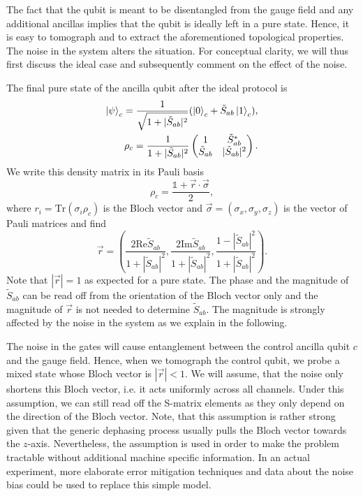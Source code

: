 \documentclass[a4paper,twocolumn,11pt, accepted=2024-06-14]{quantumarticle}
\begin{document}
The fact that the qubit is meant to be disentangled from the gauge field and any additional ancillas implies that the qubit is ideally left in a pure state. Hence, it is easy to tomograph and to extract the aforementioned topological properties. The noise in the system alters the situation. For conceptual clarity, we will thus first discuss the ideal case and subsequently comment on the effect of the noise.

The final pure state of the ancilla qubit after the ideal protocol is
\begin{equation}
\begin{split}
    \ket{\psi}_c = \frac{1}{\sqrt{1+|\tilde{S}_{ab}|^2}}(\ket{0}_c + \tilde{S}_{ab}\ket{1}_c),\\
    \rho_c = \frac{1}{1+|\tilde{S}_{ab}|^2}\begin{pmatrix}
    1 & \tilde{S}_{ab}^* \\
    \tilde{S}_{ab} & |\tilde{S}_{ab}|^2
    \end{pmatrix}.
\end{split}
\end{equation}
We write this density matrix in its Pauli basis 
\begin{equation}
    \rho_c = \frac{\mathbb{1} + \vec{r} \cdot \vec{\sigma}}{2},
\end{equation}
where  $r_i = \text{Tr}(\sigma_i\rho_c)$ is the Bloch vector and $\vec{\sigma} = (\sigma_x, \sigma_y, \sigma_z)$ is the vector of Pauli matrices and find
\begin{equation}
    \vec{r} = \left( \frac{2 \text{Re}\tilde{S}_{ab}}{1+|\tilde{S}_{ab}|^2}, \frac{2 \text{Im}\tilde{S}_{ab}}{1+|\tilde{S}_{ab}|^2}, \frac{1 - |\tilde{S}_{ab}|^2}{1+|\tilde{S}_{ab}|^2} \right).\label{eqn:bloch}
\end{equation}
Note that $|\vec{r}| = 1$ as expected for a pure state. The phase and the magnitude of $\tilde S_{ab}$ can be read off from the orientation of the Bloch vector only and the magnitude of $\vec r$ is not needed to determine $\tilde S_{ab}$. The magnitude is strongly affected by the noise in the system as we explain in the following.

The noise in the gates will cause entanglement between the control ancilla qubit $c$ and the gauge field. Hence, when we tomograph the control qubit, we probe a mixed state whose Bloch vector is $|\vec{r}|< 1$. We will assume, that the noise only shortens this Bloch vector, i.e. it acts uniformly across all channels. Under this assumption, we can still read off the S-matrix elements as they only depend on the direction of the Bloch vector. Note, that this assumption is rather strong given that the generic dephasing process usually pulls the Bloch vector towards the $z$-axis. Nevertheless, the assumption is used in order to make the problem tractable without additional machine specific information. In an actual experiment, more elaborate error mitigation techniques and data about the noise bias could be used to replace this simple model.
\end{document}
